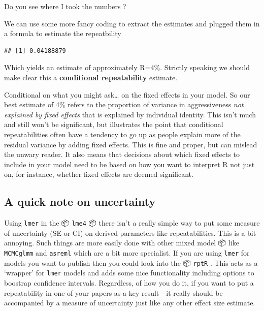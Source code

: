 \documentclass[
  12pt,
]{book}
\makeatletter
\newenvironment{Shaded}{\begin{snugshade}}{\end{snugshade}}
\newcommand{\DecValTok}[1]{\textcolor[rgb]{0.00,0.00,0.81}{#1}}
\newcommand{\KeywordTok}[1]{\textcolor[rgb]{0.13,0.29,0.53}{\textbf{#1}}}
\newcommand{\NormalTok}[1]{#1}
\newcommand{\OperatorTok}[1]{\textcolor[rgb]{0.81,0.36,0.00}{\textbf{#1}}}
\newcommand{\StringTok}[1]{\textcolor[rgb]{0.31,0.60,0.02}{#1}}
\newenvironment{kframe}{%
\medskip{}
\setlength{\fboxsep}{.8em}
\def\at@end@of@kframe{}%
\ifinner\ifhmode%
 \def\at@end@of@kframe{\end{minipage}}%
 \begin{minipage}{\columnwidth}%
\fi\fi%
\def\FrameCommand##1{\hskip\@totalleftmargin \hskip-\fboxsep
\colorbox{incolor}{##1}\hskip-\fboxsep
    \hskip-\linewidth \hskip-\@totalleftmargin \hskip\columnwidth}%
\MakeFramed {\advance\hsize-\width
  \@totalleftmargin\z@ \linewidth\hsize
  \@setminipage}}%
{\par\unskip\endMakeFramed%
\at@end@of@kframe}
\newenvironment{rmdblock}[1]
 {
 \begin{itemize}
 \renewcommand{\labelitemi}{
   \raisebox{-.7\height}[0pt][0pt]{
     {\setkeys{Gin}{width=3em,keepaspectratio}\texttt{[image: images/icons/\#1]}}
   }
 }
 \begin{kframe}
 \setlength{\fboxsep}{1em}
 \item
 }
 {
 \end{kframe}
 \end{itemize}
 }
\newenvironment{rmdcode}
  {\begin{rmdblock}{code}}
  {\end{rmdblock}}
\makeatother
\begin{document}
\begin{rmdcode}
Do you see where I took the numbers ?
\end{rmdcode}

We can use some more fancy coding to extract the estimates and plugged them in a formula to estimate the repeatbility

\begin{Shaded}
\end{Shaded}

\begin{verbatim}
## [1] 0.04188879
\end{verbatim}

Which yields an estimate of approximately R=4\%. Strictly speaking we should make clear this a \textbf{conditional repeatability} estimate.

Conditional on what you might ask\ldots{} on the fixed effects in your model. So our best estimate of 4\% refers to the proportion of variance in aggressiveness \emph{not explained by fixed effects} that is explained by individual identity. This isn't much and still won't be significant, but illustrates the point that conditional repeatabilities often have a tendency to go up as people explain more of the residual variance by adding fixed effects. This is fine and proper, but can mislead the unwary reader.
It also means that decisions about which fixed effects to include in your model need to be based on how you want to interpret R not just on, for instance, whether fixed effects are deemed significant.

\hypertarget{a-quick-note-on-uncertainty}{%
\subsection{A quick note on uncertainty}\label{a-quick-note-on-uncertainty}}

Using \texttt{lmer} in the 📦 \texttt{lme4} 📦 there isn't a really simple way to put some measure of uncertainty (SE or CI) on derived parameters like repeatabilities. This is a bit annoying. Such things are more easily done with other mixed model 📦 like \texttt{MCMCglmm} and \texttt{asreml} which are a bit more specialist. If you are using \texttt{lmer} for models you want to publish then you could look into the 📦 \texttt{rptR} \citep{R-rptR}. This acts as a `wrapper' for \texttt{lmer} models and adds some nice functionality including options to boostrap confidence intervals. Regardless, of how you do it, if you want to put a repeatability in one of your papers as a key result - it really should be accompanied by a measure of uncertainty just like any other effect size estimate.
\end{document}
